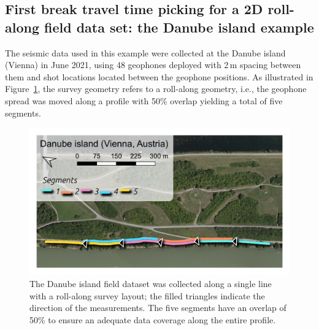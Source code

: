 \documentclass[a4paper,fleqn]{cas-sc}
\begin{document}
\subsection{First break travel time picking for a 2D roll-along field data set: the Danube island example}

The seismic data used in this example were collected at the Danube island (Vienna) in June 2021, using 48 geophones deployed with 2\,m spacing between them and shot locations located between the geophone positions. As illustrated in Figure~\ref{fig:map_danube}, the survey geometry refers to a roll-along geometry, i.e., the geophone spread was moved along a profile with 50\% overlap yielding a total of five segments.
\begin{figure}
	\centering
	\includegraphics[width=.75\textwidth]{./figures/map_danube.pdf}
	\caption{The Danube island field dataset was collected along a single line with a roll-along survey layout; the filled triangles indicate the direction of the measurements. The five segments have an overlap of 50\% to ensure an adequate data coverage along the entire profile.}
	\label{fig:map_danube}
\end{figure}
\end{document}
